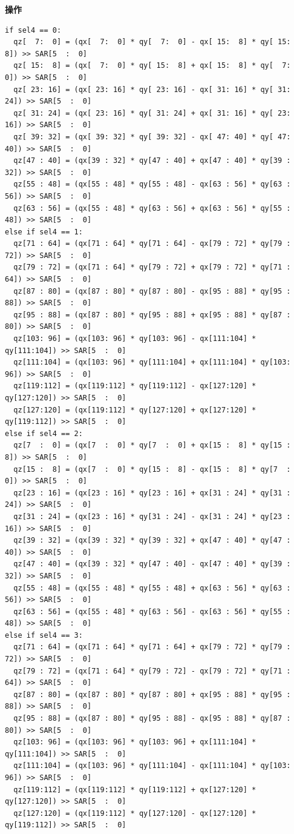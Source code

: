 \textbf{操作}\\
\begin{lstlisting}
if sel4 == 0:
  qz[  7:  0] = (qx[  7:  0] * qy[  7:  0] - qx[ 15:  8] * qy[ 15:  8]) >> SAR[5  :  0]
  qz[ 15:  8] = (qx[  7:  0] * qy[ 15:  8] + qx[ 15:  8] * qy[  7:  0]) >> SAR[5  :  0]
  qz[ 23: 16] = (qx[ 23: 16] * qy[ 23: 16] - qx[ 31: 16] * qy[ 31: 24]) >> SAR[5  :  0]
  qz[ 31: 24] = (qx[ 23: 16] * qy[ 31: 24] + qx[ 31: 16] * qy[ 23: 16]) >> SAR[5  :  0]
  qz[ 39: 32] = (qx[ 39: 32] * qy[ 39: 32] - qx[ 47: 40] * qy[ 47: 40]) >> SAR[5  :  0]
  qz[47 : 40] = (qx[39 : 32] * qy[47 : 40] + qx[47 : 40] * qy[39 : 32]) >> SAR[5  :  0]
  qz[55 : 48] = (qx[55 : 48] * qy[55 : 48] - qx[63 : 56] * qy[63 : 56]) >> SAR[5  :  0]
  qz[63 : 56] = (qx[55 : 48] * qy[63 : 56] + qx[63 : 56] * qy[55 : 48]) >> SAR[5  :  0]
else if sel4 == 1:
  qz[71 : 64] = (qx[71 : 64] * qy[71 : 64] - qx[79 : 72] * qy[79 : 72]) >> SAR[5  :  0]
  qz[79 : 72] = (qx[71 : 64] * qy[79 : 72] + qx[79 : 72] * qy[71 : 64]) >> SAR[5  :  0]
  qz[87 : 80] = (qx[87 : 80] * qy[87 : 80] - qx[95 : 88] * qy[95 : 88]) >> SAR[5  :  0]
  qz[95 : 88] = (qx[87 : 80] * qy[95 : 88] + qx[95 : 88] * qy[87 : 80]) >> SAR[5  :  0]
  qz[103: 96] = (qx[103: 96] * qy[103: 96] - qx[111:104] * qy[111:104]) >> SAR[5  :  0]
  qz[111:104] = (qx[103: 96] * qy[111:104] + qx[111:104] * qy[103: 96]) >> SAR[5  :  0]
  qz[119:112] = (qx[119:112] * qy[119:112] - qx[127:120] * qy[127:120]) >> SAR[5  :  0]
  qz[127:120] = (qx[119:112] * qy[127:120] + qx[127:120] * qy[119:112]) >> SAR[5  :  0]
else if sel4 == 2:
  qz[7  :  0] = (qx[7  :  0] * qy[7  :  0] + qx[15 :  8] * qy[15 :  8]) >> SAR[5  :  0]
  qz[15 :  8] = (qx[7  :  0] * qy[15 :  8] - qx[15 :  8] * qy[7  :  0]) >> SAR[5  :  0]
  qz[23 : 16] = (qx[23 : 16] * qy[23 : 16] + qx[31 : 24] * qy[31 : 24]) >> SAR[5  :  0]
  qz[31 : 24] = (qx[23 : 16] * qy[31 : 24] - qx[31 : 24] * qy[23 : 16]) >> SAR[5  :  0]
  qz[39 : 32] = (qx[39 : 32] * qy[39 : 32] + qx[47 : 40] * qy[47 : 40]) >> SAR[5  :  0]
  qz[47 : 40] = (qx[39 : 32] * qy[47 : 40] - qx[47 : 40] * qy[39 : 32]) >> SAR[5  :  0]
  qz[55 : 48] = (qx[55 : 48] * qy[55 : 48] + qx[63 : 56] * qy[63 : 56]) >> SAR[5  :  0]
  qz[63 : 56] = (qx[55 : 48] * qy[63 : 56] - qx[63 : 56] * qy[55 : 48]) >> SAR[5  :  0]
else if sel4 == 3:
  qz[71 : 64] = (qx[71 : 64] * qy[71 : 64] + qx[79 : 72] * qy[79 : 72]) >> SAR[5  :  0]
  qz[79 : 72] = (qx[71 : 64] * qy[79 : 72] - qx[79 : 72] * qy[71 : 64]) >> SAR[5  :  0]
  qz[87 : 80] = (qx[87 : 80] * qy[87 : 80] + qx[95 : 88] * qy[95 : 88]) >> SAR[5  :  0]
  qz[95 : 88] = (qx[87 : 80] * qy[95 : 88] - qx[95 : 88] * qy[87 : 80]) >> SAR[5  :  0]
  qz[103: 96] = (qx[103: 96] * qy[103: 96] + qx[111:104] * qy[111:104]) >> SAR[5  :  0]
  qz[111:104] = (qx[103: 96] * qy[111:104] - qx[111:104] * qy[103: 96]) >> SAR[5  :  0]
  qz[119:112] = (qx[119:112] * qy[119:112] + qx[127:120] * qy[127:120]) >> SAR[5  :  0]
  qz[127:120] = (qx[119:112] * qy[127:120] - qx[127:120] * qy[119:112]) >> SAR[5  :  0]

\end{lstlisting}


